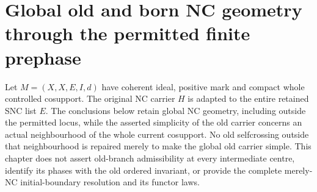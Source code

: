 \section{Global old and born NC geometry through the permitted finite prephase}
\label{sec:nc-permitted-global-carrier}

Let $M=(X,X,E,I,d)$ have coherent ideal, positive mark and compact
whole controlled cosupport. The original NC carrier $H$ is adapted to
the entire retained SNC list $E$. The conclusions below retain global
NC geometry, including outside the permitted locus, while the asserted
simplicity of the old carrier concerns an actual neighbourhood of the
whole current cosupport. No old selfcrossing outside that neighbourhood
is repaired merely to make the global old carrier simple. This chapter
does not assert old-branch admissibility at every intermediate centre,
identify its phases with the old ordered invariant, or provide the
complete merely-NC initial-boundary resolution and its functor laws.

